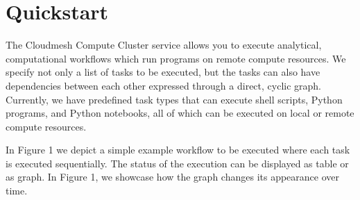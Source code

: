 \hypertarget{quickstart}{%
\section{Quickstart}\label{quickstart}}

The Cloudmesh Compute Cluster service allows you to execute analytical,
computational workflows which run programs on remote compute resources.
We specify not only a list of tasks to be executed, but the tasks can
also have dependencies between each other expressed through a direct,
cyclic graph. Currently, we have predefined task types that can execute
shell scripts, Python programs, and Python notebooks, all of which can
be executed on local or remote compute resources.

In Figure 1 we depict a simple example workflow to be executed where
each task is executed sequentially. The status of the execution can be
displayed as table or as graph. In Figure 1, we showcase how the graph
changes its appearance over time.

